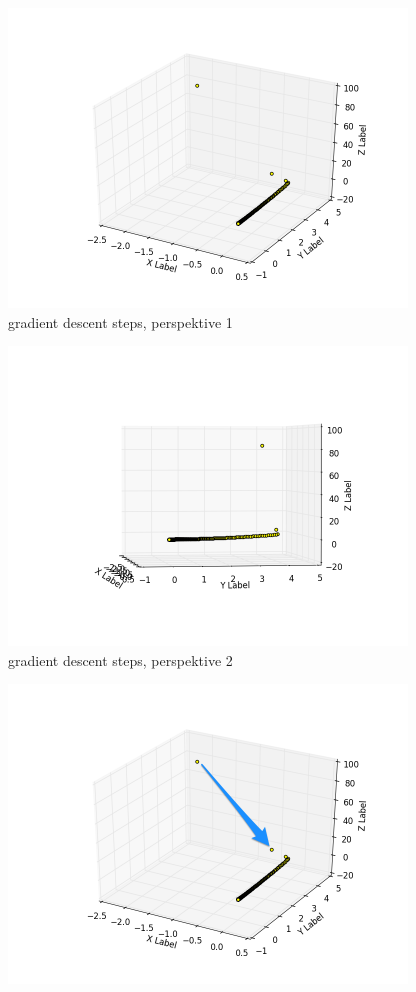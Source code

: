 \documentclass[12pt]{article}
\begin{document}
\begin{enumerate}[a)]
        \begin{figure}[H]
            \centering
            \includegraphics[width=300pt]{pictures/figure_4.png}
            \caption{gradient descent steps, perspektive 1}
            \label{fig:fig4}
        \end{figure}
        \begin{figure}[H]
            \centering
            \includegraphics[width=300pt]{pictures/figure_5.png}
            \caption{gradient descent steps, perspektive 2}
            \label{fig:fig5}
        \end{figure}
        \begin{figure}[H]
            \centering
            \includegraphics[width=300pt]{pictures/figure_6.png}

\end{figure}
\end{enumerate}
\end{document}
